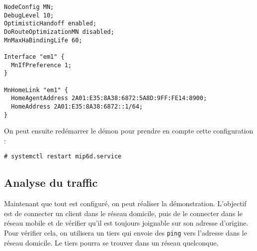\begin{lstlisting}
NodeConfig MN;
DebugLevel 10;
OptimisticHandoff enabled;
DoRouteOptimizationMN disabled;
MnMaxHaBindingLife 60;

Interface "em1" {
  MnIfPreference 1;
}

MnHomeLink "em1" {
  HomeAgentAddress 2A01:E35:8A38:6872:5A8D:9FF:FE14:8900;
  HomeAddress 2A01:E35:8A38:6872::1/64;
}
\end{lstlisting}

On peut ensuite redémarrer le démon pour prendre en compte cette configuration :

\begin{lstlisting}
# systemctl restart mip6d.service
\end{lstlisting}

\subsection{Analyse du traffic}

Maintenant que tout est configuré, on peut réaliser la démonstration.
L'objectif est de connecter un client dans le réseau domicile, puis de le connecter dans le réseau mobile et de vérifier qu'il est toujours joignable sur son adresse d'origine.
Pour vérifier cela, on utilisera un tiers qui envoie des \texttt{ping} vers l'adresse dans le réseau domicile.
Le tiers pourra se trouver dans un réseau quelconque.

